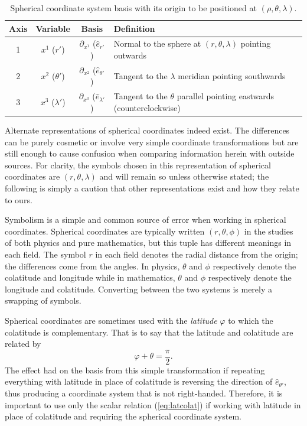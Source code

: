 \documentclass[11pt,dvipsnames]{thesis}
\begin{document}
\begin{table}[H]
\centering
\caption{Spherical coordinate system basis with its origin to be positioned at $(\rho, \theta, \lambda)$.}
\label{tab:SPHR}
\begin{tabular}{SSSl}
\toprule
{Axis} & {Variable} & {Basis} & {Definition} \\ \midrule
{1} & {$x^1$ ($r'$)} & {$\partial_{x^1}$ ($\hat{e}_{r'}$)} & {Normal to the sphere at $(r, \theta, \lambda)$ pointing outwards} \\
{2} & {$x^2$ ($\theta'$)} & {$\partial_{x^2}$ ($\hat{e}_{\theta'}$)} & {Tangent to the $\lambda$ meridian pointing southwards} \\
{3} & {$x^3$ ($\lambda'$)} & {$\partial_{x^3}$ ($\hat{e}_{\lambda'}$)} & {Tangent to the $\theta$ parallel pointing eastwards (counterclockwise)} \\ \bottomrule
\end{tabular}
\end{table}

Alternate representations of spherical coordinates indeed exist. The differences can be purely cosmetic or involve very simple coordinate transformations but are still enough to cause confusion when comparing information herein with outside sources. For clarity, the symbols chosen in this representation of spherical coordinates are $(r, \theta, \lambda)$ and will remain so unless otherwise stated; the following is simply a caution that other representations exist and how they relate to ours.

Symbolism is a simple and common source of error when working in spherical coordinates. Spherical coordinates are typically written $(r, \theta, \phi)$ in the studies of both physics and pure mathematics, but this tuple has different meanings in each field. The symbol $r$ in each field denotes the radial distance from the origin; the differences come from the angles. In physics, $\theta$ and $\phi$ respectively denote the colatitude and longitude while in mathematics, $\theta$ and $\phi$ respectively denote the longitude and colatitude. Converting between the two systems is merely a swapping of symbols.

Spherical coordinates are sometimes used with the \textit{latitude} $\varphi$ to which the colatitude is complementary. That is to say that the latitude and colatitude are related by
\begin{equation}
\varphi + \theta = \frac{\pi}{2}. \label{eq:latcolat}
\end{equation}
The effect had on the basis from this simple transformation if repeating everything with latitude in place of colatitude is reversing the direction of $\hat{e}_{\theta'}$, thus producing a coordinate system that is not right-handed. Therefore, it is important to use only the scalar relation (\ref{eq:latcolat}) if working with latitude in place of colatitude and requiring the spherical coordinate system.
\end{document}
